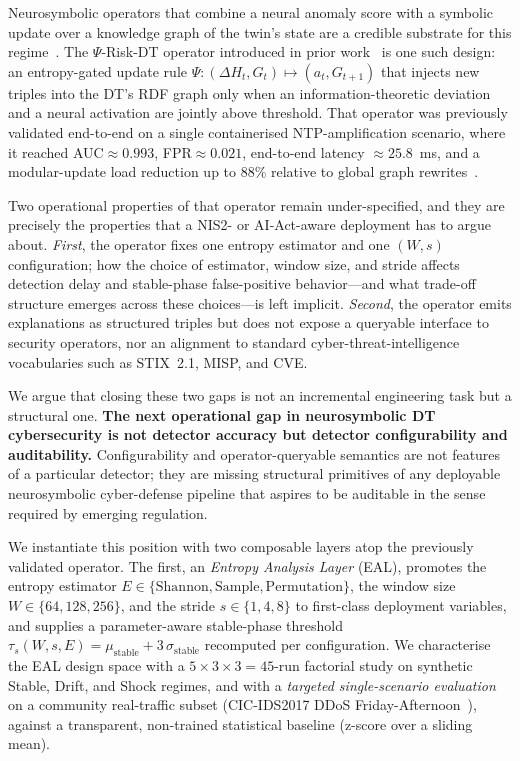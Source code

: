 \documentclass[futureinternet,article,submit,pdftex,moreauthors]{Definitions/mdpi}
\newcommand{\psiop}{\ensuremath{\Psi}}
\newcommand{\EntropyDeviation}{\ensuremath{\Delta H}}
\newcommand{\taus}{\ensuremath{\tau_{s}}}
\begin{document}
Neurosymbolic operators that combine a neural anomaly score with a
symbolic update over a knowledge graph of the twin's state are a
credible substrate for this regime~\cite{garcez2023,raedt2020}. The
$\psiop$-Risk-DT operator introduced in prior work~\cite{paper3} is one
such design: an entropy-gated update rule
$\psiop : (\EntropyDeviation_t, G_t) \mapsto (a_t, G_{t+1})$ that injects new triples
into the DT's RDF graph only when an information-theoretic deviation
and a neural activation are jointly above threshold. That operator was
previously validated end-to-end on a single containerised
NTP-amplification scenario, where it reached AUC$\approx 0.993$,
FPR$\approx 0.021$, end-to-end latency $\approx 25.8$~ms, and a
modular-update load reduction up to $88\%$ relative to global graph
rewrites~\cite{paper3}.

Two operational properties of that operator remain under-specified, and
they are precisely the properties that a NIS2- or AI-Act-aware
deployment has to argue about. \emph{First}, the operator fixes one
entropy estimator and one $(W, s)$ configuration; how the choice of
estimator, window size, and stride affects detection delay and
stable-phase false-positive behavior---and what trade-off structure
emerges across these choices---is left implicit. \emph{Second}, the
operator emits explanations as structured triples but does not expose a
queryable interface to security operators, nor an alignment to standard
cyber-threat-intelligence vocabularies such as STIX~2.1, MISP, and CVE.

We argue that closing these two gaps is not an incremental engineering
task but a structural one. \textbf{The next operational gap in
neurosymbolic DT cybersecurity is not detector accuracy but detector
configurability and auditability.} Configurability and operator-queryable
semantics are not features of a particular detector; they are missing
structural primitives of any deployable neurosymbolic cyber-defense
pipeline that aspires to be auditable in the sense required by emerging
regulation.

We instantiate this position with two composable layers atop the
previously validated operator. The first, an \emph{Entropy Analysis
Layer} (EAL), promotes the entropy estimator $E \in \{\mathrm{Shannon},
\mathrm{Sample}, \mathrm{Permutation}\}$, the window size
$W \in \{64, 128, 256\}$, and the stride $s \in \{1, 4, 8\}$ to
first-class deployment variables, and supplies a parameter-aware
stable-phase threshold
$\taus(W, s, E) = \mu_{\mathrm{stable}} + 3\,\sigma_{\mathrm{stable}}$
recomputed per configuration. We characterise the EAL design space with
a $5 \times 3 \times 3 = 45$-run factorial study on synthetic Stable,
Drift, and Shock regimes, and with a \emph{targeted single-scenario
evaluation} on a community real-traffic subset (CIC-IDS2017 DDoS
Friday-Afternoon~\cite{cicids2017}), against a transparent, non-trained
statistical baseline (z-score over a sliding mean).
\end{document}
